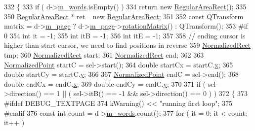 \begin{DoxyCode}
332 \{
333     \textcolor{keywordflow}{if} ( d->\hyperlink{classOkular_1_1TextPagePrivate_a36b703334a8775136cb4308209afd1cb}{m\_words}.isEmpty() )
334         \textcolor{keywordflow}{return} \textcolor{keyword}{new} \hyperlink{classOkular_1_1RegularAreaRect}{RegularAreaRect}();
335 
350     \hyperlink{classOkular_1_1RegularAreaRect}{RegularAreaRect} * ret= \textcolor{keyword}{new} \hyperlink{classOkular_1_1RegularAreaRect}{RegularAreaRect};
351 
352     \textcolor{keyword}{const} QTransform matrix = d->\hyperlink{classOkular_1_1TextPagePrivate_a6662808b6ba334f5c7abc157759260b9}{m\_page} ? d->\hyperlink{classOkular_1_1TextPagePrivate_a6662808b6ba334f5c7abc157759260b9}{m\_page}->\hyperlink{classOkular_1_1PagePrivate_a87e2009afc3a1f31a0b03d3a6a359a03}{rotationMatrix}() : 
      QTransform();
353 \textcolor{preprocessor}{#if 0}
354     \textcolor{keywordtype}{int} it = -1;
355     \textcolor{keywordtype}{int} itB = -1;
356     \textcolor{keywordtype}{int} itE = -1;
357 
358     \textcolor{comment}{// ending cursor is higher than start cursor, we need to find positions in reverse}
359     \hyperlink{classOkular_1_1NormalizedRect}{NormalizedRect} tmp;
360     \hyperlink{classOkular_1_1NormalizedRect}{NormalizedRect} start;
361     \hyperlink{classOkular_1_1NormalizedRect}{NormalizedRect} end;
362 
363     \hyperlink{classOkular_1_1NormalizedPoint}{NormalizedPoint} startC = sel->start();
364     \textcolor{keywordtype}{double} startCx = startC.\hyperlink{classOkular_1_1NormalizedPoint_a857f49b9bc7712430d167472ef9dbd94}{x};
365     \textcolor{keywordtype}{double} startCy = startC.\hyperlink{classOkular_1_1NormalizedPoint_ac2276daabda627d5f82bb1532c293047}{y};
366 
367     \hyperlink{classOkular_1_1NormalizedPoint}{NormalizedPoint} endC = sel->end();
368     \textcolor{keywordtype}{double} endCx = endC.\hyperlink{classOkular_1_1NormalizedPoint_a857f49b9bc7712430d167472ef9dbd94}{x};
369     \textcolor{keywordtype}{double} endCy = endC.\hyperlink{classOkular_1_1NormalizedPoint_ac2276daabda627d5f82bb1532c293047}{y};
370 
371     \textcolor{keywordflow}{if} ( sel->direction() == 1 || ( sel->itB() == -1 && sel->direction() == 0 ) )
372     \{
373 \textcolor{preprocessor}{#ifdef DEBUG\_TEXTPAGE}
374         kWarning() << \textcolor{stringliteral}{"running first loop"};
375 \textcolor{preprocessor}{#endif}
376         \textcolor{keyword}{const} \textcolor{keywordtype}{int} count = d->\hyperlink{classOkular_1_1TextPagePrivate_a36b703334a8775136cb4308209afd1cb}{m\_words}.count();
377         \textcolor{keywordflow}{for} ( it = 0; it < count; it++ )

\end{DoxyCode}
